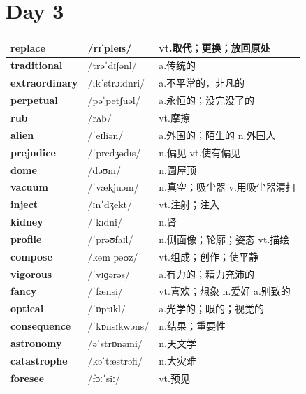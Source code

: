 \documentclass[14pt,a4paper]{extarticle}
\begin{document}
\newpage
\section{Day 3}

\begin{longtable}{ p{} p{} p{} }
\hline
\endfirsthead
\hline
\endhead
\endfoot
\endlastfoot

\textbf{replace} & /rɪˈpleɪs/ & vt.取代；更换；放回原处 \\ \hline
\textbf{traditional} & /trəˈdɪʃənl/ & a.传统的 \\ \hline
\textbf{extraordinary} & /ɪkˈstrɔːdnri/ & a.不平常的，非凡的 \\ \hline
\textbf{perpetual} & /pəˈpetʃuəl/ & a.永恒的；没完没了的 \\ \hline
\textbf{rub} & /rʌb/ & vt.摩擦 \\ \hline
\textbf{alien} & /ˈeɪliən/ & a.外国的；陌生的 \quad n.外国人 \\ \hline
\textbf{prejudice} & /ˈpredʒədɪs/ & n.偏见 \quad vt.使有偏见 \\ \hline
\textbf{dome} & /dəʊm/ & n.圆屋顶 \\ \hline
\textbf{vacuum} & /ˈvækjuəm/ & n.真空；吸尘器 \quad v.用吸尘器清扫 \\ \hline
\textbf{inject} & /ɪnˈdʒekt/ & vt.注射；注入 \\ \hline
\textbf{kidney} & /ˈkɪdni/ & n.肾 \\ \hline
\textbf{profile} & /ˈprəʊfaɪl/ & n.侧面像；轮廓；姿态 \quad vt.描绘 \\ \hline
\textbf{compose} & /kəmˈpəʊz/ & vt.组成；创作；使平静 \\ \hline
\textbf{vigorous} & /ˈvɪɡərəs/ & a.有力的；精力充沛的 \\ \hline
\textbf{fancy} & /ˈfænsi/ & vt.喜欢；想象 \quad n.爱好 \quad a.别致的 \\ \hline
\textbf{optical} & /ˈɒptɪkl/ & a.光学的；眼的；视觉的 \\ \hline
\textbf{consequence} & /ˈkɒnsɪkwəns/ & n.结果；重要性 \\ \hline
\textbf{astronomy} & /əˈstrɒnəmi/ & n.天文学 \\ \hline
\textbf{catastrophe} & /kəˈtæstrəfi/ & n.大灾难 \\ \hline
\textbf{foresee} & /fɔːˈsiː/ & vt.预见 \\ \hline

\end{longtable}
\end{document}
